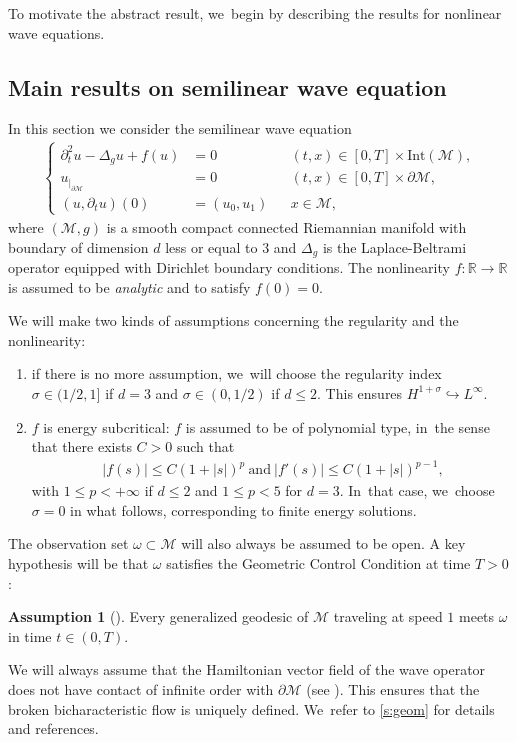 \documentclass[JEP,XML,SOM,Unicode,published]{cedram}
\theoremstyle{definition}
\newtheorem{assum}{Assumption}
\newenvironment{assump}[2][]
{\renewcommand\theassum{#2}\begin{assum}[#1]}
{\end{assum}}
\let\mc\mathcal
\newcommand{\M}{\mc{M}}
\newcommand{\R}{\mathbb{R}}
\begin{document}
To motivate the abstract result, we~begin by describing the results for nonlinear wave equations.

\subsection{Main results on semilinear wave equation}\label{s:waveIntro} In this section we consider the semilinear wave equation
\begin{align}\label{eq:nlw-1}
\left\{\begin{aligned}
\partial_t^2 u-\Delta_g u+f(u)&=0 &&(t, x)\in [0, T]\times \text{Int}(\M),\\
u_{|_{\partial\M}}&=0 &&(t, x)\in [0, T]\times\partial\M,\\
(u, \partial_t u)(0)&=(u_0, u_1) && x\in \M,
\end{aligned}\right.
\end{align}
where $(\M, g)$ is a smooth compact connected Riemannian manifold with boundary of dimension $d$ less or equal to $3$ and $\Delta_g$ is the Laplace-Beltrami operator equipped with Dirichlet boundary conditions. The nonlinearity $f: \R\to \R$ is assumed to be \emph{analytic} and to satisfy $f(0)=0$.

We will make two kinds of assumptions concerning the regularity and the nonlinearity:
\begin{enumerate}
\item if there is no more assumption, we~will choose the regularity index $\sigma\in (1/2,1]$ if $d=3$ and $\sigma\in (0,1/2)$ if $d\leq 2$. This ensures $H^{1+\sigma}\hookrightarrow L^{\infty}$.
\item $f$ is energy subcritical: $f$ is assumed to be of polynomial type, in~the sense that there exists $C>0$ such that
\begin{align}\label{hip:nonlinearity-hyp-1}
\ |f(s)|\leq C(1+|s|)^p\ \text{and}\ |f'(s)|\leq C(1+|s|)^{p-1},
\end{align}
with $1\leq p<+\infty$ if $d\leq 2$ and $1\leq p<5$ for $d=3$. In~that case, we~choose $\sigma=0$ in what follows, corresponding to finite energy solutions.
\end{enumerate}

The observation set $\omega\subset \M$ will also always be assumed to be open. A key hypothesis will be that $\omega$ satisfies the Geometric Control Condition at time $T>0$:
\begin{assump}{GCC}\label{assumGCC}
Every generalized geodesic of $\M$ traveling at speed $1$ meets $\omega$ in time $t\in (0, T)$.
\end{assump}
We will always assume that the Hamiltonian vector field of the wave operator does not have contact of infinite order with $\partial \M$ (see \cite{MS:78}). This ensures that the broken bicharacteristic flow is uniquely defined. We~refer to \cref{s:geom} for details and references.
\end{document}
